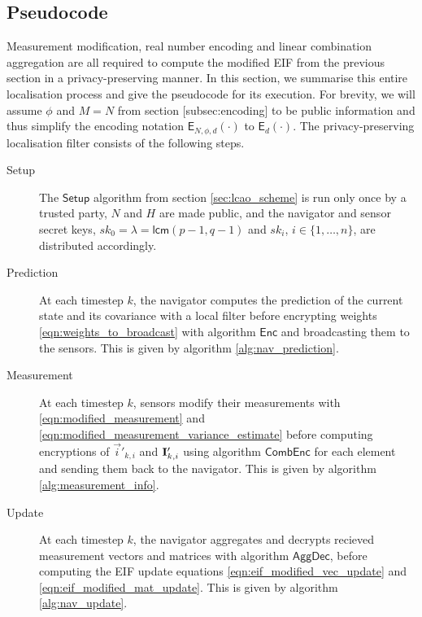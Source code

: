 \subsection{Pseudocode}\label{subsec:nonlin_fusion:pseudocode}
Measurement modification, real number encoding and linear combination aggregation are all required to compute the modified EIF from the previous section in a privacy-preserving manner. In this section, we summarise this entire localisation process and give the pseudocode for its execution. For brevity, we will assume $\phi$ and $M=N$ from section [subsec:encoding] to be public information and thus simplify the encoding notation $\mathsf{E}_{N,\phi,d}(\cdot)$ to $\mathsf{E}_{d}(\cdot)$. The privacy-preserving localisation filter consists of the following steps.
\begin{description}
    \item[Setup] The $\mathsf{Setup}$ algorithm from section \ref{sec:lcao_scheme} is run only once by a trusted party, $N$ and $H$ are made public, and the navigator and sensor secret keys, $sk_0=\lambda=\mathsf{lcm}(p-1, q-1)$ and $sk_i$, $i\in\{1,\dots,n\}$, are distributed accordingly. 

    \item[Prediction] At each timestep $k$, the navigator computes the prediction of the current state and its covariance with a local filter before encrypting weights \eqref{eqn:weights_to_broadcast} with algorithm $\mathsf{Enc}$ and broadcasting them to the sensors. This is given by algorithm \ref{alg:nav_prediction}.

    \item[Measurement] At each timestep $k$, sensors modify their measurements with \eqref{eqn:modified_measurement} and \eqref{eqn:modified_measurement_variance_estimate} before computing encryptions of $\vec{i}'_{k,i}$ and ${{\mathbf{I}}}'_{k,i}$ using algorithm $\mathsf{CombEnc}$ for each element and sending them back to the navigator. This is given by algorithm \ref{alg:measurement_info}.

    \item[Update] At each timestep $k$, the navigator aggregates and decrypts recieved measurement vectors and matrices with algorithm $\mathsf{AggDec}$, before computing the EIF update equations \eqref{eqn:eif_modified_vec_update} and \eqref{eqn:eif_modified_mat_update}. This is given by algorithm \ref{alg:nav_update}.
\end{description}

